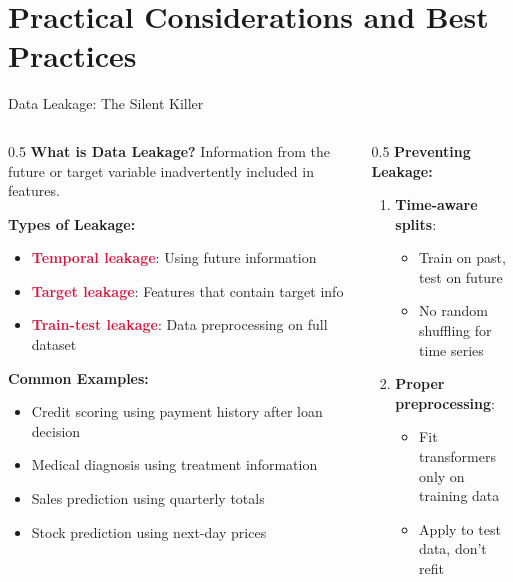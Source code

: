 \documentclass[aspectratio=169,11pt]{beamer}
\begin{document}
\section{Practical Considerations and Best Practices}

\begin{frame}{Data Leakage: The Silent Killer}
\begin{columns}
\begin{column}{0.5\textwidth}
\textbf{What is Data Leakage?}
Information from the future or target variable inadvertently included in features.

\vspace{0.3cm}
\textbf{Types of Leakage:}

\begin{itemize}
\item \textcolor{crimson}{\textbf{Temporal leakage}}: Using future information
\item \textcolor{crimson}{\textbf{Target leakage}}: Features that contain target info
\item \textcolor{crimson}{\textbf{Train-test leakage}}: Data preprocessing on full dataset
\end{itemize}

\vspace{0.3cm}
\textbf{Common Examples:}
\begin{itemize}
\item Credit scoring using payment history after loan decision
\item Medical diagnosis using treatment information
\item Sales prediction using quarterly totals
\item Stock prediction using next-day prices
\end{itemize}
\end{column}
\begin{column}{0.5\textwidth}
\textbf{Preventing Leakage:}

\begin{enumerate}
\item \textbf{Time-aware splits}:
   \begin{itemize}
   \item Train on past, test on future
   \item No random shuffling for time series
   \end{itemize}

\item \textbf{Proper preprocessing}:
   \begin{itemize}
   \item Fit transformers only on training data
   \item Apply to test data, don't refit
   \end{itemize}


\end{enumerate}
\end{column}
\end{columns}
\end{frame}
\end{document}

